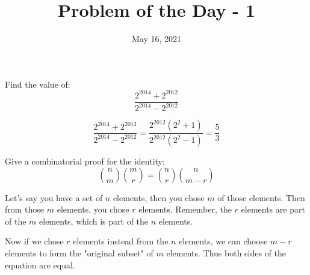 \documentclass[answers]{exam}
\title{Problem of the Day - 1}
\date{May 16, 2021}
\begin{document}
	\maketitle
	\begin{questions}
		\question
		Find the value of:
		\begin{equation*}
		\frac{2^{2014} + 2^{2012}}{2^{2014} - 2^{2012}}
		\end{equation*}
		
		\begin{solution}
			\begin{equation*}
			 \frac{2^{2014} + 2^{2012}}{2^{2014} - 2^{2012}} = \frac{2^{2012}(2^2 + 1)}{2^{2012}(2^2 -1)} = \frac{5}{3}
			\end{equation*}
		\end{solution}
	
		\question
		Give a combinatorial proof for the identity:
		\begin{equation*}
			{n \choose m}{m \choose r} = {n \choose r}{n \choose m-r}
		\end{equation*}
		
		\begin{solution}
			Let's say you have a set of $n$ elements, then you chose $m$ of those elements.
			Then from those $m$ elements, you chose $r$ elements. Remember, the $r$ elements are part of the $m$ elements,
			which is part of the $n$ elements.
			
			Now if we chose $r$ elements instead from the $n$ elements, we can choose $m-r$ elements to form
			the "original subset" of $m$ elements. Thus both sides of the equation are equal.
		\end{solution} 
	\end{questions}
\end{document}
